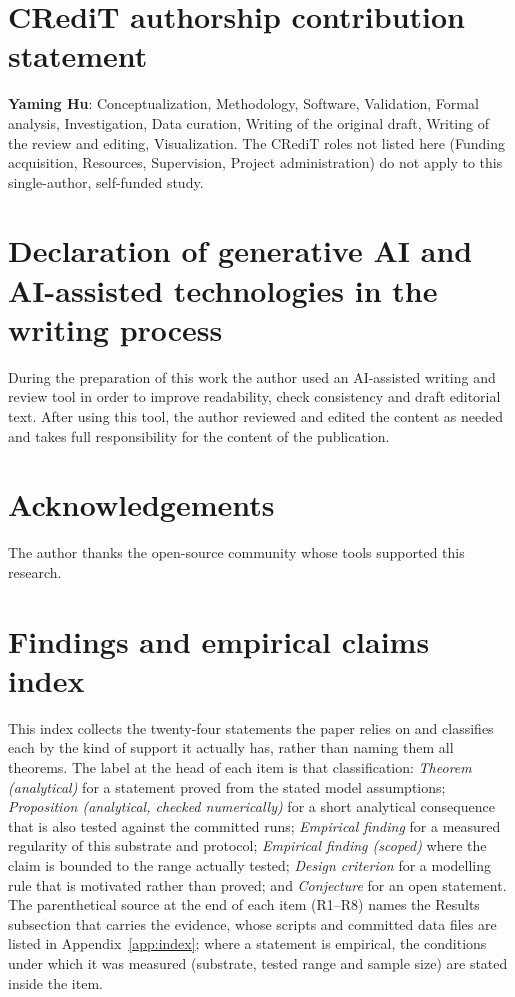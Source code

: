 \documentclass[preprint,12pt]{elsarticle}
\begin{document}
\section*{CRediT authorship contribution statement}
\textbf{Yaming Hu}: Conceptualization, Methodology, Software, Validation,
Formal analysis, Investigation, Data curation, Writing of the original draft,
Writing of the review and editing, Visualization. The CRediT roles not listed
here (Funding acquisition, Resources, Supervision, Project administration) do
not apply to this single-author, self-funded study.

\section*{Declaration of generative AI and AI-assisted technologies in the
writing process}
During the preparation of this work the author used an AI-assisted
writing and review tool in order to improve readability, check consistency
and draft editorial text. After using this tool, the author reviewed and
edited the content as needed and takes full responsibility for the content of
the publication.

\section*{Acknowledgements}
The author thanks the open-source community whose tools supported this
research.

\appendix

\setcounter{table}{0}
\renewcommand{\thetable}{A\arabic{table}}

\section{Findings and empirical claims index}
\label{app:theorems}

This index collects the twenty-four statements the paper relies on and
classifies each by the kind of support it actually has, rather than naming
them all theorems. The label at the head of each item is that
classification: \emph{Theorem (analytical)} for a statement proved from the
stated model assumptions; \emph{Proposition (analytical, checked
numerically)} for a short analytical consequence that is also tested against
the committed runs; \emph{Empirical finding} for a measured regularity of
this substrate and protocol; \emph{Empirical finding (scoped)} where the claim
is bounded to the range actually tested; \emph{Design criterion} for a
modelling rule that is motivated rather than proved; and \emph{Conjecture}
for an open statement. The parenthetical source at the end of each item
(R1--R8) names the Results subsection that carries the evidence, whose scripts
and committed data files are listed in Appendix~\ref{app:index}; where a
statement is empirical, the conditions under which it was measured
(substrate, tested range and sample size) are stated inside the item.
\end{document}
